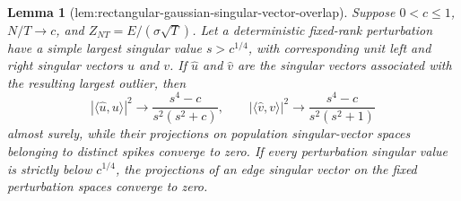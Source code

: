 \documentclass{article}
\newtheorem{lemma}{Lemma}
\begin{document}
\begin{lemma}[lem:rectangular-gaussian-singular-vector-overlap]\label{lem:rectangular-gaussian-singular-vector-overlap}
Suppose \(0<c\leq1\), \(N/T\to c\), and \(Z_{NT}=E/(\sigma\sqrt T)\).  Let a deterministic fixed-rank perturbation have a simple largest singular value \(s>c^{1/4}\), with corresponding unit left and right singular vectors \(u\) and \(v\).  If \(\widehat u\) and \(\widehat v\) are the singular vectors associated with the resulting largest outlier, then
\[
|\langle\widehat u,u\rangle|^2\longrightarrow
\frac{s^4-c}{s^2(s^2+c)},\qquad
|\langle\widehat v,v\rangle|^2\longrightarrow
\frac{s^4-c}{s^2(s^2+1)}
\]
almost surely, while their projections on population singular-vector spaces belonging to distinct spikes converge to zero.  If every perturbation singular value is strictly below \(c^{1/4}\), the projections of an edge singular vector on the fixed perturbation spaces converge to zero.
\end{lemma}
\end{document}
